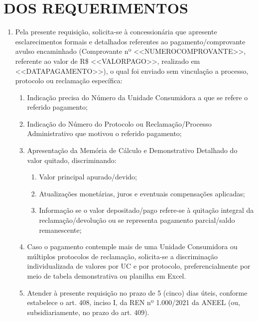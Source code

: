 \newcommand{\tipoRequerimento}{Solicitação de Esclarecimento sobre Pagamento Avulso e Identificação de Origem (UC e Reclamação)}
\newcommand{\empresaDocumentos}{intro,final}

\section{DOS REQUERIMENTOS}

\begin{enumerate}[resume]
\item Pela presente requisição, solicita-se à concessionária que apresente esclarecimentos formais e detalhados referentes ao pagamento/comprovante avulso encaminhado (Comprovante nº <<NUMEROCOMPROVANTE>>, referente ao valor de R\$ <<VALORPAGO>>, realizado em <<DATAPAGAMENTO>>), o qual foi enviado sem vinculação a processo, protocolo ou reclamação específica:
\begin{enumerate}
  \item Indicação precisa do Número da Unidade Consumidora a que se refere o referido pagamento;
  \item Indicação do Número do Protocolo ou Reclamação/Processo Administrativo que motivou o referido pagamento;
  \item Apresentação da Memória de Cálculo e Demonstrativo Detalhado do valor quitado, discriminando:
  \begin{enumerate}
    \item Valor principal apurado/devido;
    \item Atualizações monetárias, juros e eventuais compensações aplicadas;
    \item Informação se o valor depositado/pago refere-se à quitação integral da reclamação/devolução ou se representa pagamento parcial/saldo remanescente;
  \end{enumerate}
  \item Caso o pagamento contemple mais de uma Unidade Consumidora ou múltiplos protocolos de reclamação, solicita-se a discriminação individualizada de valores por UC e por protocolo, preferencialmente por meio de tabela demonstrativa ou planilha em Excel.
  \item Atender à presente requisição no prazo de 5 (cinco) dias úteis, conforme estabelece o art. 408, inciso I, da REN nº 1.000/2021 da ANEEL (ou, subsidiariamente, no prazo do art. 409).
\end{enumerate}
\end{enumerate}

